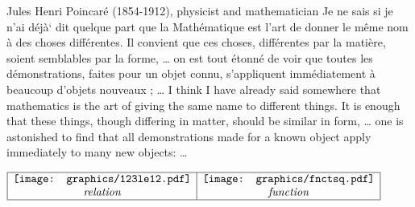 \newpage\mbox{}\vfill
\qboxnqt
  {
    Jules Henri Poincar\'e (1854-1912), physicist and mathematician
    \footnotemark
  }
  {Je ne sais si je n'ai d\'ej\`a` dit quelque part que la Math\'ematique est 
  l'art de donner le m\^eme nom \`a des choses diff\'erentes. 
  Il convient que ces choses, diff\'erentes par la mati\`ere, 
  soient semblables par la forme, 
  \ldots
  on est tout \'etonn\'e 
  de voir que toutes les d\'emonstrations, faites pour un objet connu, 
  s'appliquent imm\'ediatement \`a beaucoup d'objets nouveaux ; 
  \ldots
  }
  {I think I have already said somewhere that mathematics is the art
   of giving the same name to different things. 
   It is enough that these things, though differing in matter, 
   should be similar in form, 
   \ldots
   one is astonished to find that all
   demonstrations made for a known object apply immediately to many new objects:
   \ldots
   }
\vfill\mbox{}

\newpage\mbox{}\vfill
{}

$\begin{array}{|c|c|}
   \hline
   \texttt{[image: graphics/123le12.pdf]}
  &\texttt{[image: graphics/fnctsq.pdf]}
  \\\ope{relation}&\ope{function}
  \\\hline
\end{array}$
\vfill\mbox{}

